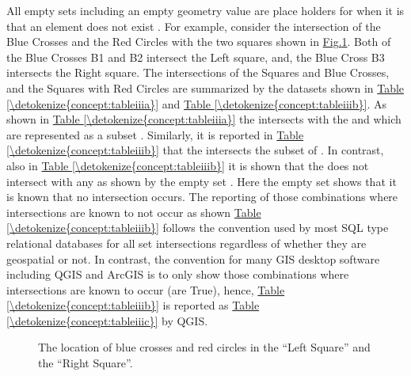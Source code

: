 \documentclass[letterpaper,11pt,english]{sphinxmanual}
\begin{document}
All empty sets including an empty geometry value are place holders for when it is  that an element does not exist .  For example, consider the intersection of the Blue Crosses and the Red Circles with the two squares shown in \hyperref[\detokenize{concept:figuresquarepoint}]{Fig.\@ \ref{\detokenize{concept:figuresquarepoint}}}.  Both of the Blue Crosses B1 and B2 intersect the Left square, and, the Blue Cross B3 intersects the Right square.  The intersections of the Squares and Blue Crosses, and the Squares with Red Circles are summarized by the datasets shown in \hyperref[\detokenize{concept:tableiiia}]{Table \ref{\detokenize{concept:tableiiia}}} and \hyperref[\detokenize{concept:tableiiib}]{Table \ref{\detokenize{concept:tableiiib}}}.  As shown in  \hyperref[\detokenize{concept:tableiiia}]{Table \ref{\detokenize{concept:tableiiia}}} the  intersects with the   and  which are represented as a subset .  Similarly, it is reported in \hyperref[\detokenize{concept:tableiiib}]{Table \ref{\detokenize{concept:tableiiib}}} that the  intersects the subset of  .  In contrast, also in \hyperref[\detokenize{concept:tableiiib}]{Table \ref{\detokenize{concept:tableiiib}}} it is shown that the  does not intersect with any  as shown by the empty set \sphinxstyleemphasis{\{ \}}.  Here the empty set \sphinxstyleemphasis{\{ \}} shows that it is known that no intersection occurs.  The reporting of those combinations where intersections are known to not occur as shown  \hyperref[\detokenize{concept:tableiiib}]{Table \ref{\detokenize{concept:tableiiib}}} follows the convention used by most SQL type relational databases for all set intersections regardless of whether they are geospatial or not.  In contrast, the convention for many GIS desktop software including QGIS and ArcGIS is to only show those combinations where intersections are known to occur (are True), hence, \hyperref[\detokenize{concept:tableiiib}]{Table \ref{\detokenize{concept:tableiiib}}} is reported as \hyperref[\detokenize{concept:tableiiic}]{Table \ref{\detokenize{concept:tableiiic}}} by QGIS.

\begin{figure}[htbp]
\centering
\capstart

\noindent{}
\caption{The location of blue crosses and red circles in the “Left Square” and the “Right Square”.}\label{\detokenize{concept:id47}}\label{\detokenize{concept:figuresquarepoint}}\end{figure}
\end{document}
